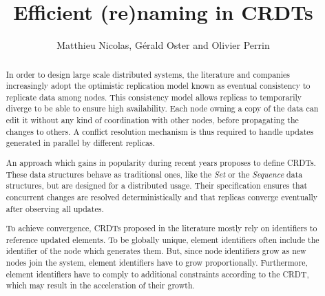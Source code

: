 \documentclass{ecscw2007}
\title{Efficient (re)naming in \acp{CRDT}}
\author{Matthieu Nicolas, Gérald Oster and Olivier Perrin}
\affiliation{Inria, F-54600,
  Université de Lorraine, LORIA, F-54506,
  CNRS, F-54506}
\begin{document}
\maketitle
\thispagestyle{empty}

\begin{abstract}


In order to design large scale distributed systems, the literature and companies increasingly adopt the optimistic replication model known as eventual consistency to replicate data among nodes.
This consistency model allows replicas to temporarily diverge to be able to ensure high availability.
Each node owning a copy of the data can edit it without any kind of coordination with other nodes, before propagating the changes to others.
A conflict resolution mechanism is thus required to handle updates generated in parallel by different replicas.


An approach which gains in popularity during recent years proposes to define \acfp{CRDT}.
These data structures behave as traditional ones, like the \emph{Set} or the \emph{Sequence} data structures, but are designed for a distributed usage.
Their specification ensures that concurrent changes are resolved deterministically and that replicas converge eventually after observing all updates.


To achieve convergence, \acp{CRDT} proposed in the literature mostly rely on identifiers to reference updated elements.
To be globally unique, element identifiers often include the identifier of the node which generates them.
But, since node identifiers grow as new nodes join the system, element identifiers have to grow proportionally.
Furthermore, element identifiers have to comply to additional constraints according to the \ac{CRDT}, which may result in the acceleration of their growth.


\end{abstract}
\end{document}
